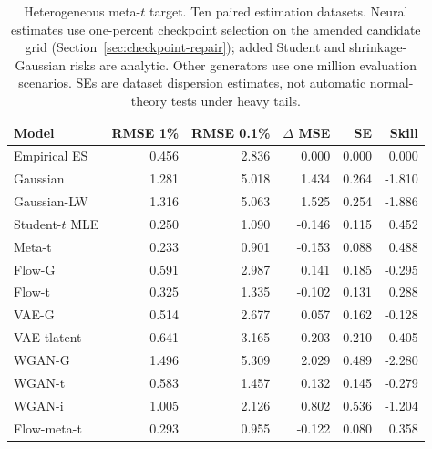 \documentclass[11pt]{article}
\theoremstyle{definition}\newtheorem{definition}[theorem]{Definition}
\theoremstyle{remark}\newtheorem{remark}[theorem]{Remark}
\begin{document}
\begin{table}[htbp]
\centering\footnotesize
\setlength{\tabcolsep}{4pt}
\begin{tabular}{lrrrrr}
\toprule
Model & RMSE 1\% & RMSE 0.1\% & $\Delta$ MSE & SE & Skill \\
\midrule
Empirical ES & 0.456 & 2.836 & 0.000 & 0.000 & 0.000 \\
Gaussian & 1.281 & 5.018 & 1.434 & 0.264 & -1.810 \\
Gaussian-LW & 1.316 & 5.063 & 1.525 & 0.254 & -1.886 \\
Student-$t$ MLE & 0.250 & 1.090 & -0.146 & 0.115 & 0.452 \\
Meta-t & 0.233 & 0.901 & -0.153 & 0.088 & 0.488 \\
Flow-G & 0.591 & 2.987 & 0.141 & 0.185 & -0.295 \\
Flow-t & 0.325 & 1.335 & -0.102 & 0.131 & 0.288 \\
VAE-G & 0.514 & 2.677 & 0.057 & 0.162 & -0.128 \\
VAE-tlatent & 0.641 & 3.165 & 0.203 & 0.210 & -0.405 \\
WGAN-G & 1.496 & 5.309 & 2.029 & 0.489 & -2.280 \\
WGAN-t & 0.583 & 1.457 & 0.132 & 0.145 & -0.279 \\
WGAN-i & 1.005 & 2.126 & 0.802 & 0.536 & -1.204 \\
Flow-meta-t & 0.293 & 0.955 & -0.122 & 0.080 & 0.358 \\
\bottomrule
\end{tabular}
\caption{Heterogeneous meta-$t$ target. Ten paired estimation datasets. Neural estimates use one-percent checkpoint selection on the amended candidate grid (Section~\ref{sec:checkpoint-repair}); added Student and shrinkage-Gaussian risks are analytic. Other generators use one million evaluation scenarios. SEs are dataset dispersion estimates, not automatic normal-theory tests under heavy tails.}\label{tab:r4-syn-metat}
\end{table}

\FloatBarrier
\end{document}

